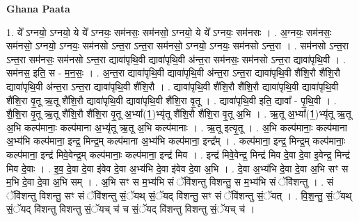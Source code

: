 \documentclass[17pt]{extarticle}
\begin{document}
\textbf{Ghana Paata } \newline

1. ये᳚ ऽग्नयो॒ ऽग्नयो॒ ये ये᳚ ऽग्नयः॒ सम॑नसः॒ सम॑नसो॒ ऽग्नयो॒ ये ये᳚ ऽग्नयः॒ सम॑नसः । . अ॒ग्नयः॒ सम॑नसः॒ सम॑नसो॒ ऽग्नयो॒ ऽग्नयः॒ सम॑नसो ऽन्त॒रा ऽन्त॒रा सम॑नसो॒ ऽग्नयो॒ ऽग्नयः॒ सम॑नसो ऽन्त॒रा । . सम॑नसो ऽन्त॒रा ऽन्त॒रा सम॑नसः॒ सम॑नसो ऽन्त॒रा द्यावा॑पृथि॒वी द्यावा॑पृथि॒वी अ॑न्त॒रा सम॑नसः॒ सम॑नसो ऽन्त॒रा द्यावा॑पृथि॒वी । . सम॑नस॒ इति॒ स - म॒न॒सः॒ । . अ॒न्त॒रा द्यावा॑पृथि॒वी द्यावा॑पृथि॒वी अ॑न्त॒रा ऽन्त॒रा द्यावा॑पृथि॒वी शै॑शि॒रौ शै॑शि॒रौ द्यावा॑पृथि॒वी अ॑न्त॒रा ऽन्त॒रा द्यावा॑पृथि॒वी शै॑शि॒रौ । . द्यावा॑पृथि॒वी शै॑शि॒रौ शै॑शि॒रौ द्यावा॑पृथि॒वी द्यावा॑पृथि॒वी शै॑शि॒रा वृ॒तू ऋ॒तू शै॑शि॒रौ द्यावा॑पृथि॒वी द्यावा॑पृथि॒वी शै॑शि॒रा वृ॒तू । . द्यावा॑पृथि॒वी इति॒ द्यावा᳚ - पृ॒थि॒वी । . शै॒शि॒रा वृ॒तू ऋ॒तू शै॑शि॒रौ शै॑शि॒रा वृ॒तू अ॒भ्या᳚(1॒)भ्यृ॑तू शै॑शि॒रौ शै॑शि॒रा वृ॒तू अ॒भि । . ऋ॒तू अ॒भ्या᳚(1॒)भ्यृ॑तू ऋ॒तू अ॒भि कल्प॑मानाः॒ कल्प॑माना अ॒भ्यृ॑तू ऋ॒तू अ॒भि कल्प॑मानाः । . ऋ॒तू इत्यृ॒तू । . अ॒भि कल्प॑मानाः॒ कल्प॑माना अ॒भ्य॑भि कल्प॑माना॒ इन्द्र॒ मिन्द्र॒म् कल्प॑माना अ॒भ्य॑भि कल्प॑माना॒ इन्द्र᳚म् । . कल्प॑माना॒ इन्द्र॒ मिन्द्र॒म् कल्प॑मानाः॒ कल्प॑माना॒ इन्द्र॑ मिवे॒वेन्द्र॒म् कल्प॑मानाः॒ कल्प॑माना॒ इन्द्र॑ मिव । . इन्द्र॑ मिवे॒वेन्द्र॒ मिन्द्र॑ मिव दे॒वा दे॒वा इ॒वेन्द्र॒ मिन्द्र॑ मिव दे॒वाः । . इ॒व॒ दे॒वा दे॒वा इ॑वेव दे॒वा अ॒भ्य॑भि दे॒वा इ॑वेव दे॒वा अ॒भि । . दे॒वा अ॒भ्य॑भि दे॒वा दे॒वा अ॒भि सꣳ स म॒भि दे॒वा दे॒वा अ॒भि सम् । . अ॒भि सꣳ स म॒भ्य॑भि सं ॅवि॑शन्तु विशन्तु॒ स म॒भ्य॑भि सं ॅवि॑शन्तु । . सं ॅवि॑शन्तु विशन्तु॒ सꣳ सं ॅवि॑शन्तु सं॒ॅयथ् सं॒ॅयद् वि॑शन्तु॒ सꣳ सं ॅवि॑शन्तु सं॒ॅयत् । . वि॒श॒न्तु॒ सं॒ॅयथ् सं॒ॅयद् वि॑शन्तु विशन्तु सं॒ॅयच् च॑ च सं॒ॅयद् वि॑शन्तु विशन्तु सं॒ॅयच् च॑ । \newline
\end{document}
